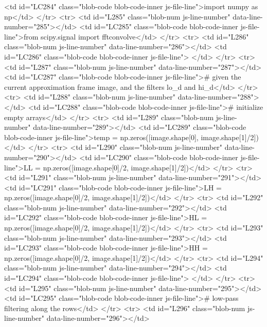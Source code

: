         <td id="LC284" class="blob-code blob-code-inner js-file-line">import numpy as np</td>
      </tr>
      <tr>
        <td id="L285" class="blob-num js-line-number" data-line-number="285"></td>
        <td id="LC285" class="blob-code blob-code-inner js-file-line">from scipy.signal import fftconvolve</td>
      </tr>
      <tr>
        <td id="L286" class="blob-num js-line-number" data-line-number="286"></td>
        <td id="LC286" class="blob-code blob-code-inner js-file-line">
</td>
      </tr>
      <tr>
        <td id="L287" class="blob-num js-line-number" data-line-number="287"></td>
        <td id="LC287" class="blob-code blob-code-inner js-file-line"># given the current approximation frame image, and the filters lo_d and hi_d</td>
      </tr>
      <tr>
        <td id="L288" class="blob-num js-line-number" data-line-number="288"></td>
        <td id="LC288" class="blob-code blob-code-inner js-file-line"># initialize empty arrays</td>
      </tr>
      <tr>
        <td id="L289" class="blob-num js-line-number" data-line-number="289"></td>
        <td id="LC289" class="blob-code blob-code-inner js-file-line">temp = np.zeros([image.shape[0], image.shape[1]/2])</td>
      </tr>
      <tr>
        <td id="L290" class="blob-num js-line-number" data-line-number="290"></td>
        <td id="LC290" class="blob-code blob-code-inner js-file-line">LL = np.zeros([image.shape[0]/2, image.shape[1]/2])</td>
      </tr>
      <tr>
        <td id="L291" class="blob-num js-line-number" data-line-number="291"></td>
        <td id="LC291" class="blob-code blob-code-inner js-file-line">LH = np.zeros([image.shape[0]/2, image.shape[1]/2])</td>
      </tr>
      <tr>
        <td id="L292" class="blob-num js-line-number" data-line-number="292"></td>
        <td id="LC292" class="blob-code blob-code-inner js-file-line">HL = np.zeros([image.shape[0]/2, image.shape[1]/2])</td>
      </tr>
      <tr>
        <td id="L293" class="blob-num js-line-number" data-line-number="293"></td>
        <td id="LC293" class="blob-code blob-code-inner js-file-line">HH = np.zeros([image.shape[0]/2, image.shape[1]/2])</td>
      </tr>
      <tr>
        <td id="L294" class="blob-num js-line-number" data-line-number="294"></td>
        <td id="LC294" class="blob-code blob-code-inner js-file-line">
</td>
      </tr>
      <tr>
        <td id="L295" class="blob-num js-line-number" data-line-number="295"></td>
        <td id="LC295" class="blob-code blob-code-inner js-file-line"># low-pass filtering along the rows</td>
      </tr>
      <tr>
        <td id="L296" class="blob-num js-line-number" data-line-number="296"></td>
